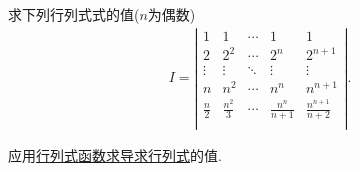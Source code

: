 \documentclass[../../main.tex]{subfiles}%
\begin{document}
\begin{example}
求下列行列式式的值($n$为偶数)
\begin{align*}
I=\left| \begin{matrix}
1&		1&		\cdots&		1&		1\\
2&		2^2&		\cdots&		2^n&		2^{n+1}\\
\vdots&		\vdots&		\ddots&		\vdots&		\vdots\\
n&		n^2&		\cdots&		n^n&		n^{n+1}\\
\frac{n}{2}&		\frac{n^2}{3}&		\cdots&		\frac{n^n}{n+1}&		\frac{n^{n+1}}{n+2}\\
\end{matrix} \right|.
\end{align*}
\end{example}
\begin{note}
应用\hyperref[proposition:行列式的求导运算]{行列式函数求导求行列式}的值.
\end{note}
\end{document}
